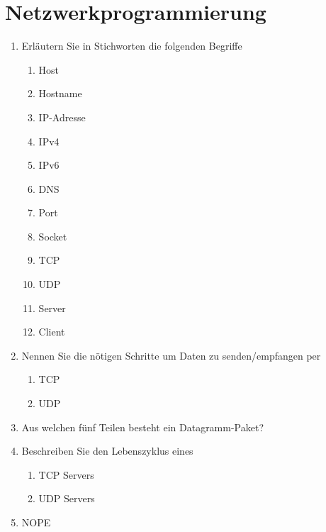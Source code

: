 \newpage
\section{Netzwerkprogrammierung}

\begin{enumerate}
	\item Erläutern Sie in Stichworten die folgenden Begriffe
        \begin{enumerate}[label=(\alph*)]
            \item Host  
            \item Hostname 
            \item IP-Adresse 
            \item IPv4
            \item IPv6
            \item DNS
            \item Port
            \item Socket
            \item TCP
            \item UDP
            \item Server
            \item Client
        \end{enumerate}
    \item Nennen Sie die nötigen Schritte um Daten zu senden/empfangen per
        \begin{enumerate}[label=(\alph*)]
            \item TCP
            \item UDP
        \end{enumerate} 
    \item Aus welchen fünf Teilen besteht ein Datagramm-Paket?
    \item Beschreiben Sie den Lebenszyklus eines 
        \begin{enumerate}[label=(\alph*)]
            \item TCP Servers
            \item UDP Servers
        \end{enumerate}
    \item NOPE
\end{enumerate}
